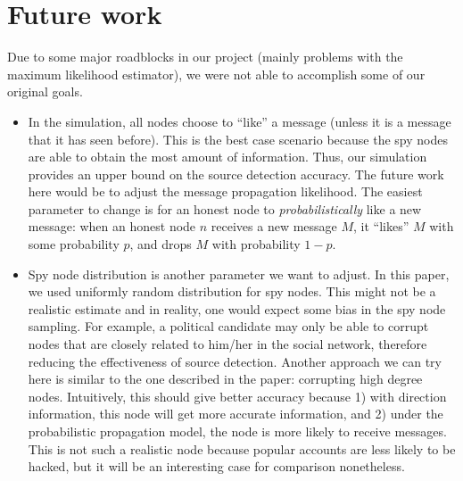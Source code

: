 \section{Future work}

Due to some major roadblocks in our project (mainly problems with the maximum likelihood estimator), we were not able to accomplish some of our original goals. 

\begin{itemize}

\item In the simulation, all nodes choose to ``like'' a message (unless it is a message that it has seen before). This is the best case scenario because the spy nodes are able to obtain the most amount of information. Thus, our simulation provides an upper bound on the source detection accuracy. The future work here would be to adjust the message propagation likelihood. The easiest parameter to change is for an honest node to \emph{probabilistically} like a new message: when an honest node $n$ receives a new message $M$, it ``likes'' $M$ with some probability $p$, and drops $M$ with probability $1-p$.

\item Spy node distribution is another parameter we want to adjust. In this paper, we used uniformly random distribution for spy nodes. This might not be a realistic estimate and in reality, one would expect some bias in the spy node sampling. For example, a political candidate may only be able to corrupt nodes that are closely related to him/her in the social network, therefore reducing the effectiveness of source detection. Another approach we can try here is similar to the one described in the paper: corrupting high degree nodes. Intuitively, this should give better accuracy because 1) with direction information, this node will get more accurate information, and 2) under the probabilistic propagation model, the node is more likely to receive messages. This is not such a realistic node because popular accounts are less likely to be hacked, but it will be an interesting case for comparison nonetheless.

\end{itemize}
